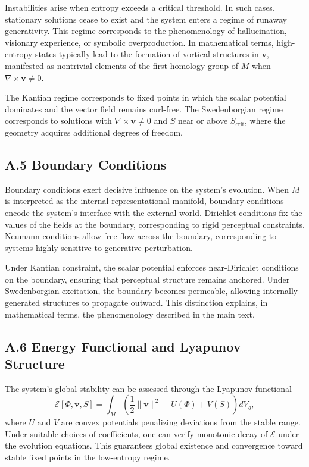 \documentclass[12pt]{article}
\begin{document}
Instabilities arise when entropy exceeds a critical threshold. In such cases, 
stationary solutions cease to exist and the system enters a regime of runaway 
generativity. This regime corresponds to the phenomenology of hallucination, 
visionary experience, or symbolic overproduction. In mathematical terms, 
high-entropy states typically lead to the formation of vortical structures in 
$\mathbf{v}$, manifested as nontrivial elements of the first homology group of 
$M$ when $\nabla \times \mathbf{v} \ne 0$.

The Kantian regime corresponds to fixed points in which the scalar potential 
dominates and the vector field remains curl-free. The Swedenborgian regime 
corresponds to solutions with $\nabla \times \mathbf{v} \ne 0$ and $S$ near or 
above $S_{\mathrm{crit}}$, where the geometry acquires additional degrees of 
freedom.

\subsection*{A.5 Boundary Conditions}

Boundary conditions exert decisive influence on the system’s evolution. When 
$M$ is interpreted as the internal representational manifold, boundary 
conditions encode the system’s interface with the external world. Dirichlet 
conditions fix the values of the fields at the boundary, corresponding to 
rigid perceptual constraints. Neumann conditions allow free flow across the 
boundary, corresponding to systems highly sensitive to generative perturbation.

Under Kantian constraint, the scalar potential enforces near-Dirichlet 
conditions on the boundary, ensuring that perceptual structure remains 
anchored. Under Swedenborgian excitation, the boundary becomes permeable, 
allowing internally generated structures to propagate outward. This 
distinction explains, in mathematical terms, the phenomenology described in 
the main text.

\subsection*{A.6 Energy Functional and Lyapunov Structure}

The system’s global stability can be assessed through the Lyapunov functional
\[
\mathcal{E}[\Phi, \mathbf{v}, S]
=
\int_M 
\left(
\frac{1}{2}\|\mathbf{v}\|^2
+ U(\Phi)
+ V(S)
\right) dV_g,
\]
where $U$ and $V$ are convex potentials penalizing deviations from the stable 
range. Under suitable choices of coefficients, one can verify monotonic decay 
of $\mathcal{E}$ under the evolution equations. This guarantees global 
existence and convergence toward stable fixed points in the low-entropy 
regime.
\end{document}
